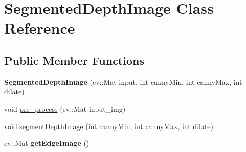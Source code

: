 \hypertarget{classSegmentedDepthImage}{
\section{SegmentedDepthImage Class Reference}
\label{classSegmentedDepthImage}
}
\subsection*{Public Member Functions}
\begin{DoxyCompactItemize}
\item 
\hypertarget{classSegmentedDepthImage_a45af15184009769834f70c04846259c5}{
{\bfseries SegmentedDepthImage} (cv::Mat input, int cannyMin, int cannyMax, int dilate)}
\label{classSegmentedDepthImage_a45af15184009769834f70c04846259c5}

\item 
void \hyperlink{classSegmentedDepthImage_ac97086cdb2c74fbd602aa48f37658468}{pre\_\-process} (cv::Mat input\_\-img)
\item 
void \hyperlink{classSegmentedDepthImage_ac0ad8ab07460fd0e01000672a59b7d17}{segmentDepthImage} (int cannyMin, int cannyMax, int dilate)
\item 
\hypertarget{classSegmentedDepthImage_a26105f01a214544a741457f9bc1e039e}{
cv::Mat {\bfseries getEdgeImage} ()}
\label{classSegmentedDepthImage_a26105f01a214544a741457f9bc1e039e}

\end{DoxyCompactItemize}


